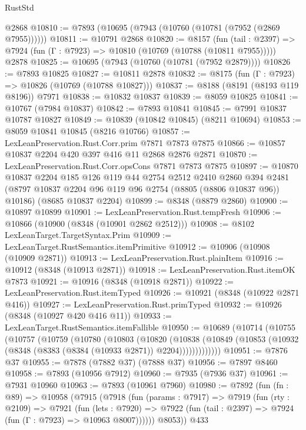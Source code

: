\begin{lexlean}{RustStd}
\begin{coremodule}
{\begin{coremodule}
{{{{{{{{{{{{{{{{{{{{{{{{{{{{{{{{{{{{{{{{{{{{{{{{{{    @2868
@10810 := @7893 (@10695 (@7943 (@10760 (@10781 (@7952 (@2869 @7955))))))
@10811 := @10791 @2868
@10820 := @8157
    (fun (tail : @2397) => @7924 (fun (Γ : @7923) => @10810 (@10769 (@10788 (@10811 @7955)))))
    @2878
@10825 := @10695 (@7943 (@10760 (@10781 (@7952 @2879))))
@10826 := @7893 @10825
@10827 := @10811 @2878
@10832 := @8175 (fun (Γ : @7923) => @10826 (@10769 (@10788 @10827)))
@10837 := @8188 (@8191 (@8193 @119 @8196)) @7971
@10838 := @10832 @10837
@10839 := @8059 @10825
@10841 := @10767 (@7984 @10837)
@10842 := @7893 @10841
@10845 := @7991 @10837 @10787 @10827
@10849 := @10839 (@10842 @10845) (@8211 @10694)
@10853 := @8059 @10841 @10845 (@8216 @10766)
@10857 := LexLeanPreservation.Rust.Corr.prim @7871 @7873 @7875
@10866 := @10857 @10837 @2204 @420 @397 @416 @11 @2868 @2876 @2871
@10870 := LexLeanPreservation.Rust.Corr.opsCons @7871 @7873 @7875
@10897 := @10870
    @10837
    @2204
    @185
    @126
    @119
    @44
    @2754
    @2512
    @2410
    @2860
    @394
    @2481
    (@8797 @10837 @2204 @96 @119 @96 @2754 (@8805 (@8806 @10837 @96)) @10186)
    (@8685 @10837 @2204)
@10899 := @8348 (@8879 @2860)
@10900 := @10897 @10899
@10901 := LexLeanPreservation.Rust.tempFresh
@10906 := @10866 (@10900 (@8348 (@10901 @2862 @2512)))
@10908 := @8102 LexLeanTarget.TargetSyntax.Prim
@10909 := LexLeanTarget.RustSemantics.itemPrimitive
@10912 := @10906 (@10908 (@10909 @2871))
@10913 := LexLeanPreservation.Rust.plainItem
@10916 := @10912 (@8348 (@10913 @2871))
@10918 := LexLeanPreservation.Rust.itemOK @7873
@10921 := @10916 (@8348 (@10918 @2871))
@10922 := LexLeanPreservation.Rust.itemTyped
@10926 := @10921 (@8348 (@10922 @2871 @416))
@10927 := LexLeanPreservation.Rust.primTyped
@10932 := @10926 (@8348 (@10927 @420 @416 @11))
@10933 := LexLeanTarget.RustSemantics.itemFallible
@10950 := @10689
    (@10714
      (@10755
        (@10757
          (@10759
            (@10780
              (@10803
                (@10820
                  (@10838
                    (@10849 (@10853 (@10932 (@8348 (@8383 (@8384 (@10933 @2871)) @2204)))))))))))))
@10951 := @7876 @37
@10955 := @7878 (@7882 @37) (@7888 @37)
@10956 := @7897 @8460
@10958 := @7893 (@10956 @7912)
@10960 := @7935 (@7936 @37)
@10961 := @7931 @10960
@10963 := @7893 (@10961 @7960)
@10980 := @7892
    (fun (fn : @89) =>
    @10958
      (@7915
        (@7918
          (fun (params : @7917) =>
          @7919
            (fun (rty : @2109) =>
            @7921
              (fun (lets : @7920) =>
              @7922 (fun (tail : @2397) => @7924 (fun (Γ : @7923) => @10963 @8007))))))
        @8053))
    @433
}}}}}}}}}}}}}}}}}}}}}}}}}}}}}}}}}}}}}}}}}}}}}}}}}}
\end{coremodule}}
\end{coremodule}
\end{lexlean}
